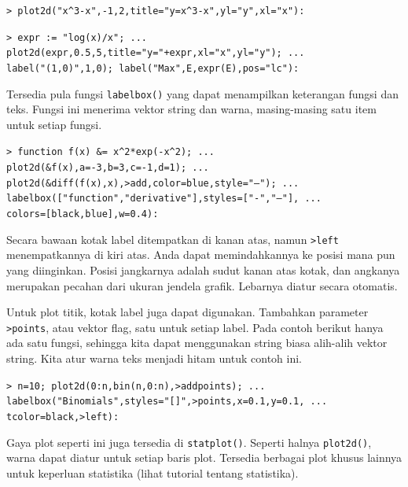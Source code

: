 \documentclass[11pt, a4paper]{article}
\newcommand{\emtcmd}[1]{\noindent\texttt{\textcolor{emtcommand}{>}\ #1}\par\smallskip}
\begin{document}
\emtcmd{plot2d("x\^{}3-x",-1,2,title="y=x\^{}3-x",yl="y",xl="x"):}
\emtcmd{expr := "log(x)/x"; ... \\
\hspace*{1em} plot2d(expr,0.5,5,title="y="+expr,xl="x",yl="y"); ... \\
\hspace*{1em} label("(1,0)",1,0); label("Max",E,expr(E),pos="lc"):}

Tersedia pula fungsi \texttt{labelbox()} yang dapat menampilkan keterangan fungsi dan teks. Fungsi ini menerima vektor string dan warna, masing-masing satu item untuk setiap fungsi.

\emtcmd{function f(x) \&= x\^{}2*exp(-x\^{}2); ... \\
\hspace*{1em} plot2d(\&f(x),a=-3,b=3,c=-1,d=1); ... \\
\hspace*{1em} plot2d(\&diff(f(x),x),>add,color=blue,style="--"); ... \\
\hspace*{1em} labelbox(["function","derivative"],styles=["-","--"], ... \\
\hspace*{2em} colors=[black,blue],w=0.4):}

Secara bawaan kotak label ditempatkan di kanan atas, namun \texttt{>left} menempatkannya di kiri atas. Anda dapat memindahkannya ke posisi mana pun yang diinginkan. Posisi jangkarnya adalah sudut kanan atas kotak, dan angkanya merupakan pecahan dari ukuran jendela grafik. Lebarnya diatur secara otomatis.

Untuk plot titik, kotak label juga dapat digunakan. Tambahkan parameter \texttt{>points}, atau vektor flag, satu untuk setiap label. Pada contoh berikut hanya ada satu fungsi, sehingga kita dapat menggunakan string biasa alih-alih vektor string. Kita atur warna teks menjadi hitam untuk contoh ini.

\emtcmd{n=10; plot2d(0:n,bin(n,0:n),>addpoints); ... \\
\hspace*{1em} labelbox("Binomials",styles="[]",>points,x=0.1,y=0.1, ... \\
\hspace*{1em} tcolor=black,>left):}

Gaya plot seperti ini juga tersedia di \texttt{statplot()}. Seperti halnya \texttt{plot2d()}, warna dapat diatur untuk setiap baris plot. Tersedia berbagai plot khusus lainnya untuk keperluan statistika (lihat tutorial tentang statistika).
\end{document}
